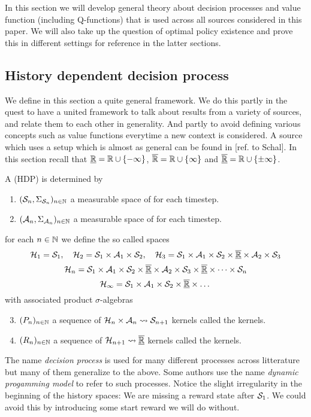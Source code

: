 
In this section we will develop general theory about
decision processes and value function (including Q-functions)
that is used across all sources considered in this paper.
We will also take up the question of optimal policy existence and 
prove this in different settings for reference
in the latter sections.

\subsection{History dependent decision process}
We define in this section a quite general framework.
We do this partly in the quest to have a united framework
to talk about results from a variety of sources,
and relate them to each other in generality.
And partly to avoid defining various concepts such as value functions
everytime a new context is considered.
A source which uses a setup which is almost as general can be found in
[ref. to Schal].
In this section recall that $\underline{\mathbb{R}} = \mathbb{R} \cup \{-\infty\}$,
$\overline{\mathbb{R}} = \mathbb{R} \cup \{\infty\}$ and
$\overline{\underline{\mathbb{R}}} = \mathbb{R} \cup \{\pm \infty\}$.

\begin{defn}
  A  (HDP) is determined by
  \begin{enumerate}
    \item $(\mathcal{S}_n, \Sigma_{\mathcal{S}_n})_{n \in \mathbb{N}}$ a 
      measurable space of  for each timestep.
    \item $(\mathcal{A}_n, \Sigma_{\mathcal{A}_n})_{n \in \mathbb{N}}$ a 
      measurable space of  for each timestep.
  \end{enumerate}
  for each $n \in \mathbb{N}$ we define the so called  spaces
  \[ \mathcal{H}_1 = \mathcal{S}_1, \quad
    \mathcal{H}_2 = \mathcal{S}_1\times \mathcal{A}_1\times \mathcal{S}_2,
    \quad \mathcal{H}_3 = \mathcal{S}_1 \times \mathcal{A}_1 \times \mathcal{S}_2 \times
  \overline{\underline{\mathbb{R}}} \times \mathcal{A}_2 \times \mathcal{S}_3 \]
  \[ \mathcal{H}_n = \mathcal{S}_1 \times \mathcal{A}_1
    \times \mathcal{S}_2 \times \overline{\underline{\mathbb{R}}} \times \mathcal{A}_2
  \times \mathcal{S}_3 \times \overline{\underline{\mathbb{R}}}\times \dots \times \mathcal{S}_n \]
  \[
    \mathcal{H}_\infty = \mathcal{S}_1 \times \mathcal{A}_1 \times \mathcal{S}_2 \times
    \overline{\underline{\mathbb{R}}} \times \dots
  \]
  with associated product $\sigma$-algebras
  \begin{enumerate} \setcounter{enumi}{2}
    \item $(P_n)_{n \in \mathbb{N}}$ a sequence of
      $\mathcal{H}_n \times \mathcal{A}_n \leadsto \mathcal{S}_{n+1}$ kernels
      called the  kernels.
    \item $(R_n)_{n \in \mathbb{N}}$ a sequence of
      $\mathcal{H}_{n+1} \leadsto \overline{\underline{\mathbb{R}}}$ kernels
      called the  kernels.
  \end{enumerate}
  \label{sett:HDP}
\end{defn}
The name \emph{decision process} is used for many different processes
across litterature but many of them generalize to the above.
Some authors use the name \emph{dynamic progamming model} to refer to
such processes.
Notice the slight irregularity in the beginning of the history spaces:
We are missing a reward state after $\mathcal{S}_1$. We could avoid
this by introducing some start reward we will do without.

